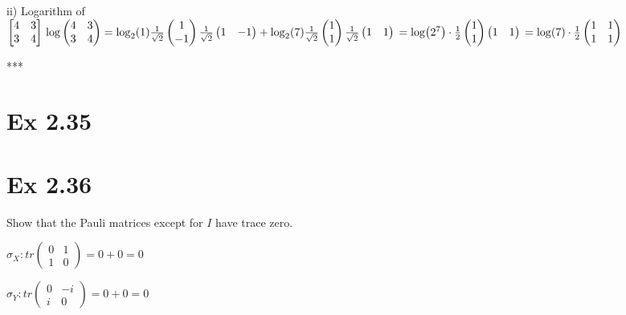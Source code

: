 \documentclass{article}
\newcommand{\0}{{$|0\rangle$}}
\newcommand{\1}{{$|1\rangle$}}
\begin{document}
ii) Logarithm of $\begin{bmatrix} 4 & 3 \\ 3 & 4 \end{bmatrix} \\ 
\log\begin{pmatrix} 4 & 3 \\ 3 & 4 \end{pmatrix} = \log_2(1) \frac{1}{\sqrt{2}} \begin{pmatrix} 1 \\ -1 \end{pmatrix} \frac{1}{\sqrt{2}} \begin{pmatrix} 1 & -1 \end{pmatrix} + \log_2(7) \frac{1}{\sqrt{2}} \begin{pmatrix} 1 \\ 1 \end{pmatrix} \frac{1}{\sqrt{2}}\begin{pmatrix} 1 & 1 \end{pmatrix} \\
= \log(2^7) \cdot \frac{1}{2} \begin{pmatrix} 1 \\ 1 \end{pmatrix}\begin{pmatrix} 1 & 1 \end{pmatrix} \\
= \log(7) \cdot \frac{1}{2} \begin{pmatrix} 1 & 1 \\ 1 & 1 \end{pmatrix}$

***
\newpage
\section*{Ex 2.35 } 

\newpage
\section*{Ex 2.36 } 
Show that the Pauli matrices except for $I$ have trace zero.

$\sigma_X: tr \begin{pmatrix} 0 & 1 \\ 1 & 0 \end{pmatrix} = 0 + 0 = 0$

$\sigma_Y: tr \begin{pmatrix} 0 & -i \\ i & 0 \end{pmatrix} = 0 + 0 = 0$
\end{document}
